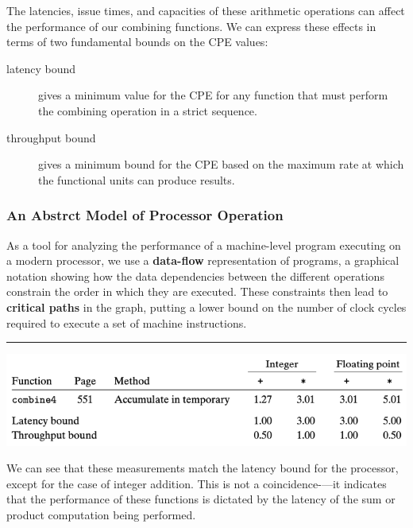 \documentclass[11pt]{article}
\begin{document}
The latencies, issue times, and capacities of these arithmetic operations can affect the performance of our combining functions. We can express these effects in terms of two fundamental bounds on the CPE values:\\
\begin{description}
\item[{latency bound}] gives a minimum value for the CPE for any function that must perform the combining operation in a strict sequence.\\
\item[{throughput bound}] gives a minimum bound for the CPE based on the maximum rate at which the functional units can produce results.\\
\end{description}


\subsubsection{An Abstrct Model of Processor Operation}
\label{sec:orge40e9a8}

As a tool for analyzing the performance of a machine-level program executing on a modern processor, we use a \textbf{data-flow} representation of programs, a graphical notation showing how the data dependencies between the different operations constrain the order in which they are executed. These constraints then lead to \textbf{critical paths} in the graph, putting a lower bound on the number of clock cycles required to execute a set of machine instructions.\\

\noindent\rule{\textwidth}{0.5pt}

\begin{center}
\includegraphics[width=.9\linewidth]{pics/combine4-cpe.png}
\end{center}

We can see that these measurements match the latency bound for the processor, except for the case of integer addition. This is not a coincidence-—it indicates that the performance of these functions is dictated by the latency of the sum or product computation being performed.\\
\end{document}
